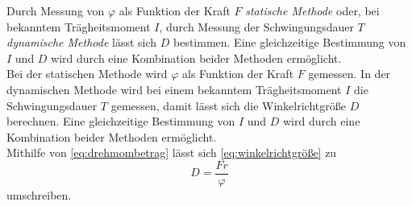 Durch Messung von $\varphi$ als Funktion der Kraft $F$ \textit{statische Methode} oder, bei bekanntem Trägheitsmoment $I$, durch Messung der Schwingungsdauer $T$ \textit{dynamische Methode} lässt sich
$D$ bestimmen. Eine gleichzeitige Bestimmung von $I$ und $D$ wird durch eine Kombination beider Methoden ermöglicht. \\

Bei der statischen Methode wird $\varphi$ als Funktion der Kraft $F$ gemessen. In der dynamischen Methode wird bei einem bekanntem Trägheitsmoment $I$ die Schwingungsdauer $T$ gemessen, damit lässt sich die Winkelrichtgröße $D$ berechnen.
Eine gleichzeitige Bestimmung von $I$ und $D$ wird durch eine Kombination beider Methoden ermöglicht.\\

Mithilfe von \eqref{eq:drehmombetrag} lässt sich \eqref{eq:winkelrichtgröße} zu
\begin{equation}
  D = \frac{F r}{\varphi}
  \label{eq:WinkelrichtgröFr}
\end{equation}
umschreiben. 